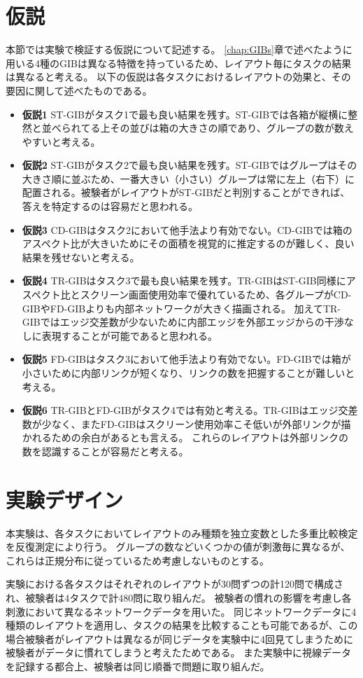 \documentclass{kuee}
\begin{document}
\section{仮説}
本節では実験で検証する仮説について記述する。
\ref{chap:GIBs}章で述べたように用いる4種のGIBは異なる特徴を持っているため、レイアウト毎にタスクの結果は異なると考える。
以下の仮説は各タスクにおけるレイアウトの効果と、その要因に関して述べたものである。
\begin{itemize}
  \item{\bf 仮説1} ST-GIBがタスク1で最も良い結果を残す。ST-GIBでは各箱が縦横に整然と並べられてる上その並びは箱の大きさの順であり、グループの数が数えやすいと考える。
  \item{\bf 仮説2} ST-GIBがタスク2で最も良い結果を残す。ST-GIBではグループはその大きさ順に並ぶため、一番大きい（小さい）グループは常に左上（右下）に配置される。被験者がレイアウトがST-GIBだと判別することができれば、答えを特定するのは容易だと思われる。
  \item{\bf 仮説3} CD-GIBはタスク2において他手法より有効でない。CD-GIBでは箱のアスペクト比が大きいためにその面積を視覚的に推定するのが難しく、良い結果を残せないと考える。
  \item{\bf 仮説4} TR-GIBはタスク3で最も良い結果を残す。TR-GIBはST-GIB同様にアスペクト比とスクリーン画面使用効率で優れているため、各グループがCD-GIBやFD-GIBよりも内部ネットワークが大きく描画される。
  加えてTR-GIBではエッジ交差数が少ないために内部エッジを外部エッジからの干渉なしに表現することが可能であると思われる。
  \item{\bf 仮説5} FD-GIBはタスク3において他手法より有効でない。FD-GIBでは箱が小さいために内部リンクが短くなり、リンクの数を把握することが難しいと考える。
  \item{\bf 仮説6} TR-GIBとFD-GIBがタスク4では有効と考える。TR-GIBはエッジ交差数が少なく、またFD-GIBはスクリーン使用効率こそ低いが外部リンクが描かれるための余白があるとも言える。
  これらのレイアウトは外部リンクの数を認識することが容易だと考える。
\end{itemize}

\section{実験デザイン}
本実験は、各タスクにおいてレイアウトのみ種類を独立変数とした多重比較検定を反復測定により行う。
グループの数などいくつかの値が刺激毎に異なるが、これらは正規分布に従っているため考慮しないものとする。

実験における各タスクはそれぞれのレイアウトが30問ずつの計120問で構成され、被験者は4タスクで計480問に取り組んだ。
被験者の慣れの影響を考慮し各刺激において異なるネットワークデータを用いた。
同じネットワークデータに4種類のレイアウトを適用し、タスクの結果を比較することも可能であるが、この場合被験者がレイアウトは異なるが同じデータを実験中に4回見てしまうために被験者がデータに慣れてしまうと考えたためである。
また実験中に視線データを記録する都合上、被験者は同じ順番で問題に取り組んだ。
\end{document}
